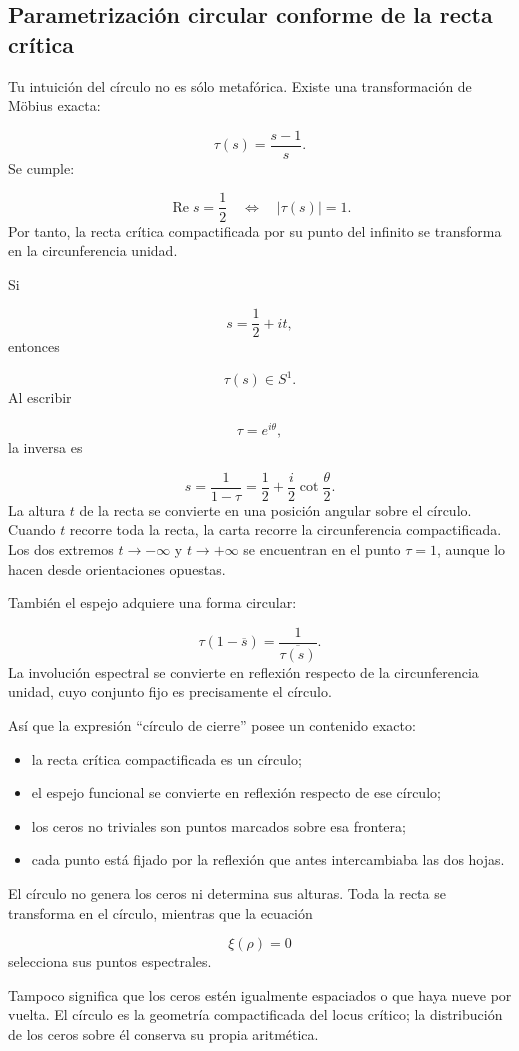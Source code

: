 \subsection{Parametrización circular conforme de la recta crítica}
Tu intuición del círculo no es sólo metafórica. Existe una transformación de Möbius exacta:\par
\[
\tau(s)
=
\frac{s-1}{s}.
\]
Se cumple:\par
\[
\operatorname{Re}s=\frac12
\quad\Longleftrightarrow\quad
|\tau(s)|=1.
\]
Por tanto, la recta crítica compactificada por su punto del infinito se transforma en la circunferencia unidad.\par
Si\par
\[
s=\frac12+it,
\]
entonces\par
\[
\tau(s)\in S^1.
\]
Al escribir\par
\[
\tau=e^{i\theta},
\]
la inversa es\par
\[
s=\frac1{1-\tau}
=
\frac12+\frac{i}{2}\cot\frac{\theta}{2}.
\]
La altura \(t\) de la recta se convierte en una posición angular sobre el círculo. Cuando \(t\) recorre toda la recta, la carta recorre la circunferencia compactificada. Los dos extremos \(t\to-\infty\) y \(t\to+\infty\) se encuentran en el punto \(\tau=1\), aunque lo hacen desde orientaciones opuestas.\par
También el espejo adquiere una forma circular:\par
\[
\tau(1-\overline s)
=
\frac1{\overline{\tau(s)}}.
\]
La involución espectral se convierte en reflexión respecto de la circunferencia unidad, cuyo conjunto fijo es precisamente el círculo.\par
Así que la expresión “círculo de cierre” posee un contenido exacto:\par
\begin{itemize}
\item la recta crítica compactificada es un círculo;
\item el espejo funcional se convierte en reflexión respecto de ese círculo;
\item los ceros no triviales son puntos marcados sobre esa frontera;
\item cada punto está fijado por la reflexión que antes intercambiaba las dos hojas.
\end{itemize}
El círculo no genera los ceros ni determina sus alturas. Toda la recta se transforma en el círculo, mientras que la ecuación\par
\[
\xi(\rho)=0
\]
selecciona sus puntos espectrales.\par
Tampoco significa que los ceros estén igualmente espaciados o que haya nueve por vuelta. El círculo es la geometría compactificada del locus crítico; la distribución de los ceros sobre él conserva su propia aritmética.\par
{}
